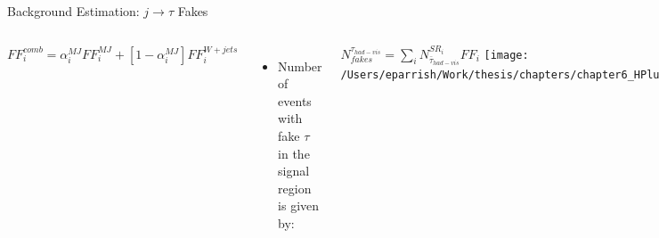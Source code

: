 \documentclass[aspectratio=169,xcolor=table]{beamer}
\begin{document}
\begin{frame}[t]{Background Estimation: $j \rightarrow \tau$ Fakes}
\begin{columns}[t]
            \centering
            \footnotesize
            $FF^{comb}_{i}=\alpha^{MJ}_{i} FF^{MJ}_{i} + [1-\alpha^{MJ}_{i}]FF^{W+jets}_{i}$
          \begin{itemize}
          \item Number of events with fake $\tau$ in the signal region is given by:
        \end{itemize}
          \centering
          \footnotesize
          $N^{\tau_{had-vis}}_{fakes} = \sum\limits_{i} N^{SR_{i}}_{\bar{\tau}_{had-vis}} FF_{i}$
      \centering
      \texttt{[image: /Users/eparrish/Work/thesis/chapters/chapter6\_HPlus/images/FFs/FFs\_FIT\_SR\_TAUJET\_1\_40\_45.png]}
        \begin{itemize}
          \tiny
          \item $\bar{\tau_{0}}$ jet width used in $\alpha$ fitting of 1-prong and 3-prong $\bar{\tau}$
        \end{itemize}
         \begin{table}
          \end{table}
      \end{columns}
    \end{frame}
\end{document}
